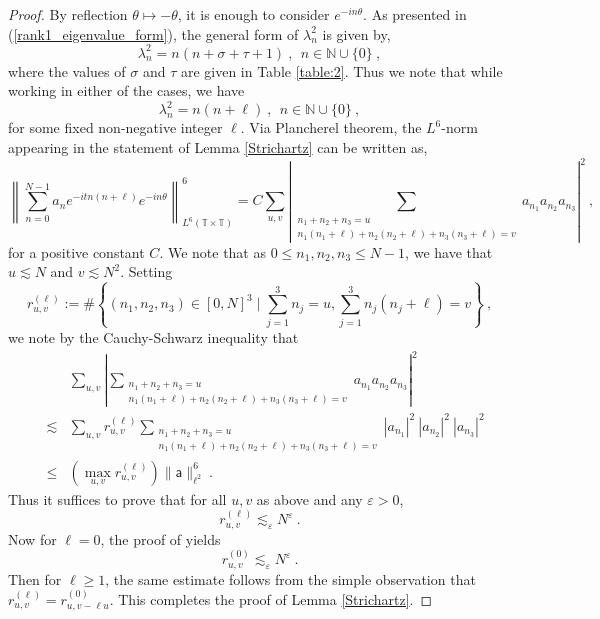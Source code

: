 \documentclass[12pt]{amsart}
\theoremstyle{definition}
\newcommand{\N}{\mathbb N}%
\newcommand{\T}{\mathbb T}%
\newcommand{\sa}{\textsf{a}}
\numberwithin{equation}{section}
\begin{document}
\begin{proof}
By reflection $\theta \mapsto -\theta$, it is enough to consider $e^{-in\theta}$. As presented in (\ref{rank1_eigenvalue_form}), the general form of  $\lambda^2_n$ is given by,
\begin{equation*} 
\lambda^2_n =n(n+\sigma+\tau+1)\:,\:\:n \in \N \cup \{0\}\:,
\end{equation*}
where the values of $\sigma$ and $\tau$ are given in Table \ref{table:2}. Thus we note that while working in either of the cases, we have
\begin{equation*} 
\lambda^2_n =n(n+\ell)\:,\:\:n \in \N \cup \{0\}\:,
\end{equation*}
for some fixed non-negative integer $\ell$. Via Plancherel theorem, the $L^6$-norm appearing in the statement of Lemma \ref{Strichartz} can be written as,
\begin{equation*} 
\left\|\sum_{n=0}^{N-1} a_n e^{-itn(n+\ell)}e^{- in\theta} \right\|^6_{L^6(\T \times \T)} = C \sum_{u,v} \left|\sum_{\substack{n_1+n_2+n_3=u \\
n_1(n_1+\ell)+n_2(n_2+\ell)+n_3(n_3+\ell)=v}}a_{n_1}a_{n_2}a_{n_3}\right|^2\:,
\end{equation*}
for a positive constant $C$. We note that as $0 \le n_1,n_2,n_3 \le N-1$, we have that $u \lesssim N$ and $v \lesssim N^2$. Setting 
\begin{equation*}
r^{(\ell)}_{u,v} := \#\left\{(n_1,n_2,n_3) \in [0,N]^3 \mid \sum_{j=1}^3 n_j=u, \sum_{j=1}^3 n_j(n_j+\ell)=v \right\}\:,
\end{equation*}
we note by the Cauchy-Schwarz inequality that 
\begin{eqnarray*}
&&\sum_{u,v} \left|\sum_{\substack{n_1+n_2+n_3=u \\
n_1(n_1+\ell)+n_2(n_2+\ell)+n_3(n_3+\ell)=v}}a_{n_1}a_{n_2}a_{n_3}\right|^2\\ 
& \lesssim & \sum_{u,v} r^{(\ell)}_{u,v} \sum_{\substack{n_1+n_2+n_3=u \\
n_1(n_1+\ell)+n_2(n_2+\ell)+n_3(n_3+\ell)=v}}|a_{n_1}|^2\:|a_{n_2}|^2\:|a_{n_3}|^2 \\
& \le & \left(\max_{u,v} r^{(\ell)}_{u,v}\right) \|\sa\|^6_{\ell^2}\:.
\end{eqnarray*}
Thus it suffices to prove that for all $u,v$ as above and any $\varepsilon>0$,
\begin{equation*}
r^{(\ell)}_{u,v} \lesssim_\varepsilon N^\varepsilon\:.
\end{equation*}
Now for $\ell=0$, the proof of \cite[Proposition 2.36]{Bourgain-GAFA} yields
\begin{equation*}
r^{(0)}_{u,v} \lesssim_\varepsilon N^\varepsilon\:.
\end{equation*}
Then for $\ell \ge 1$, the same estimate follows from the simple observation that $r^{(\ell)}_{u,v}=r^{(0)}_{u,v-\ell u}$. This completes the proof of Lemma \ref{Strichartz}.
\end{proof}
\end{document}
